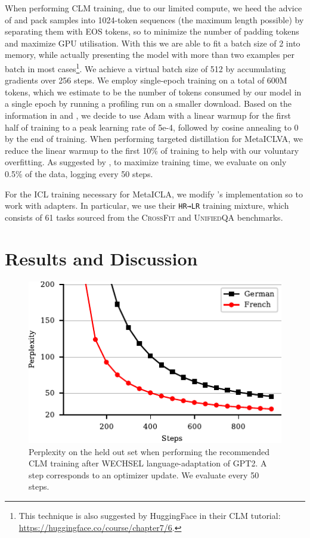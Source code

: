 \documentclass[11pt]{article}
\begin{document}
When performing CLM training, due to our limited compute, we heed the advice of
\citet{geiping_cramming_2022} and pack samples into 1024-token sequences (the maximum length
possible) by separating them with EOS tokens, so to minimize the number of padding tokens and
maximize GPU utilisation. With this we are able to fit a batch size of 2 into memory, while actually
presenting the model with more than two examples per batch in most cases\footnote{This technique is
	also suggested by HuggingFace in their CLM tutorial:
	\href{https://huggingface.co/course/chapter7/6}{https://huggingface.co/course/chapter7/6}.}. We
achieve a virtual batch size of 512 by accumulating gradients over 256 steps. We employ single-epoch
training \citep{komatsuzaki_one_2019} on a total of 600M tokens, which we estimate to be the number
of tokens consumed by our model in a single epoch by running a profiling run on a smaller download.
Based on the information in \citet{geiping_cramming_2022} and \citet{minixhofer_wechsel_2022}, we
decide to use Adam \citep{kingma_adam_2015} with a linear warmup for the first half of training to
a peak learning rate of 5e-4, followed by cosine annealing to 0 by the end of training. When
performing targeted distillation for MetaICLVA, we reduce the linear warmup to the first 10\% of
training to help with our voluntary overfitting. As suggested by \citet{izsak_how_2021}, to maximize
training time, we evaluate on only 0.5\% of the data, logging every 50 steps.

For the ICL training necessary for MetaICLA, we modify \citet{min_metaicl_2022}'s implementation so
to work with adapters. In particular, we use their \verb+HR→LR+ training mixture, which consists of
61 tasks sourced from the \textsc{CrossFit} \citep{ye_crossfit_2021} and \textsc{UnifiedQA}
\citep{khashabi_unifiedqa_2020} benchmarks.

\section{Results and Discussion}
\begin{figure}[t]
	\centering
	\includegraphics{gpt2-w_ppl.pdf}
	\caption{Perplexity on the held out set when performing the recommended CLM training after WECHSEL
		language-adaptation of GPT2. A step corresponds to an optimizer update. We evaluate every 50
		steps.}
	\label{fig:gpt2-w_ppl}
\end{figure}
\end{document}
